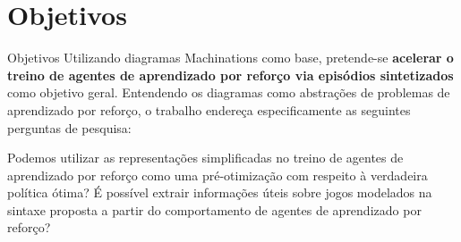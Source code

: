 \documentclass[aspectratio=169]{beamer}
\begin{document}
\section{Objetivos}

\begin{frame}{Objetivos}
    Utilizando diagramas Machinations como base, pretende-se \textbf{acelerar o treino de agentes de aprendizado por reforço via episódios sintetizados} como objetivo geral. Entendendo os diagramas como abstrações de problemas de aprendizado por reforço, o trabalho endereça especificamente as seguintes perguntas de pesquisa:
    \begin{outline}
        \1 Podemos utilizar as representações simplificadas no treino de agentes de aprendizado por reforço como uma pré-otimização com respeito à verdadeira política ótima?
        \1 É possível extrair informações úteis sobre jogos modelados na sintaxe proposta a partir do comportamento de agentes de aprendizado por reforço?
    \end{outline}
\end{frame}
\end{document}
